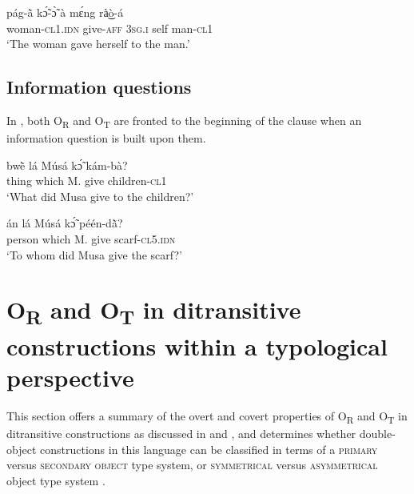\documentclass[output=paper]{langsci/langscibook}
\begin{document}
\ea
\label{ex:44.pacchiarotti}
\gll pág-\`{ã} kɔ̃́-ɔ̃̀ à mɛ́ng rà͜ò-á \\
woman-\textsc{cl1.idn}  give-\textsc{aff}  \textsc{3sg.i}    self  man-\textsc{cl1}\\
\glt `The woman gave herself to the man.'
\z

\subsection{Information questions}\label{§5.5:Information.pacchiarotti}

In , both O\textsubscript{R} and O\textsubscript{T} are fronted to the beginning of the clause when an information question is built upon them. 

\ea
\label{ex:45.pacchiarotti}
\gll bw\`{ẽ}    lá    Músá  kɔ̃́  kám-bà?  \\
thing    which    M.  give  children-\textsc{cl1}\\
\glt `What did Musa give to the children?'
\z

\ea
\label{ex:46.pacchiarotti}
\gll án    lá    Músá  kɔ̃́  péén-d\`{ã}? \\
person  which    M.  give  scarf-\textsc{cl5.idn}\\
\glt `To whom did Musa give the scarf?'
\z

\section{O\textsubscript{R} and O\textsubscript{T} in  ditransitive constructions within a typological perspective}\label{§6:or.pacchiarotti}

This section offers a summary of the overt and covert properties of O\textsubscript{R} and O\textsubscript{T} in  ditransitive constructions as discussed in  and , and determines whether double-object constructions in this language can be classified in terms of a \textsc{primary} versus \textsc{secondary object} \citep{dryer1986} type system, or \textsc{symmetrical} versus \textsc{asymmetrical} object type system \citep{bresnanmoshi1990}.
\end{document}
